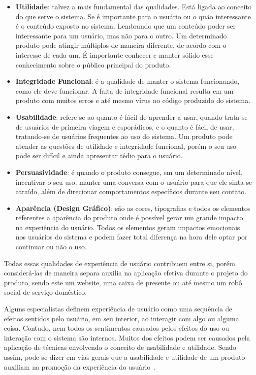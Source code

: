 \begin{itemize}
    \item \textbf{Utilidade}: talvez a mais fundamental das qualidades. Está ligada ao conceito do que serve o sistema. Se é importante para o usuário ou o quão interessante é o conteúdo exposto no sistema. Lembrando que um conteúdo poder ser interessante para um usuário, mas não para o outro. Um determinado produto pode atingir múltiplos de maneira diferente, de acordo com o interesse de cada um. É importante conhecer e manter sólido esse conhecimento sobre o público principal do produto.
    \item \textbf{Integridade Funcional}: é a qualidade de manter o sistema funcionando, como ele deve funcionar. A falta de integridade funcional resulta em um produto com muitos erros e até mesmo vírus no código produzido do sistema.
    \item \textbf{Usabilidade}: refere-se ao quanto é fácil de aprender a usar, quando trata-se de usuários de primeira viagem e esporádicos, e o quanto é fácil de usar, tratando-se de usuários frequentes ao uso do sistema. Um produto pode atender as questões de utilidade e integridade funcional, porém o seu uso pode ser difícil e ainda apresentar tédio para o usuário.
    \item \textbf{Persuasividade}: é quando o produto consegue, em um determinado nível, incentivar o seu uso, manter uma conversa com o usuário para que ele sinta-se atraído, além de direcionar comportamentos específicos durante seu contato.
    \item \textbf{Aparência (Design Gráfico)}: são as cores, tipografias e todos os elementos referentes a aparência do produto onde é possível gerar um grande impacto na experiência do usuário. Todos os elementos geram impactos emocionais nos usuários do sistema e podem fazer total diferença na hora dele optar por continuar ou não o uso.
\end{itemize}

Todas essas qualidades de experiência de usuário contribuem entre si, porém considerá-las de maneira separa auxilia na aplicação efetiva durante o projeto do produto, sendo este um website, uma caixa de presente ou até mesmo um robô social de serviço doméstico.

Alguns especialistas definem experiência de usuário como uma sequência de efeitos sentidos pelo usuário, em seu interior, ao interagir com algo ou alguma coisa. Contudo, nem todos os sentimentos causados pelos efeitos do uso ou interação com o sistema são internos. Muitos dos efeitos podem ser causados pela aplicação de técnicas envolvendo o conceito de usabilidade e utilidade. Sendo assim, pode-se dizer em vias gerais que a usabilidade e utilidade de um produto auxiliam na promoção da experiência do usuário~\cite{hartson:2012}.

